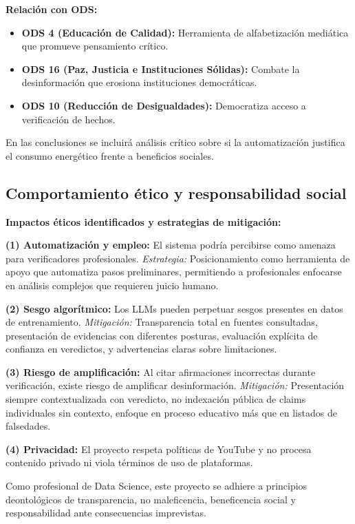 \documentclass[12pt,a4paper]{article}
\begin{document}
\textbf{Relación con ODS:}
\begin{itemize}
    \item \textbf{ODS 4 (Educación de Calidad):} Herramienta de alfabetización mediática que promueve pensamiento crítico.
    \item \textbf{ODS 16 (Paz, Justicia e Instituciones Sólidas):} Combate la desinformación que erosiona instituciones democráticas.
    \item \textbf{ODS 10 (Reducción de Desigualdades):} Democratiza acceso a verificación de hechos.
\end{itemize}

En las conclusiones se incluirá análisis crítico sobre si la automatización justifica el consumo energético frente a beneficios sociales.

\subsection{Comportamiento ético y responsabilidad social}

\textbf{Impactos éticos identificados y estrategias de mitigación:}

\textbf{(1) Automatización y empleo:} El sistema podría percibirse como amenaza para verificadores profesionales. \textit{Estrategia:} Posicionamiento como herramienta de apoyo que automatiza pasos preliminares, permitiendo a profesionales enfocarse en análisis complejos que requieren juicio humano.

\textbf{(2) Sesgo algorítmico:} Los LLMs pueden perpetuar sesgos presentes en datos de entrenamiento. \textit{Mitigación:} Transparencia total en fuentes consultadas, presentación de evidencias con diferentes posturas, evaluación explícita de confianza en veredictos, y advertencias claras sobre limitaciones.

\textbf{(3) Riesgo de amplificación:} Al citar afirmaciones incorrectas durante verificación, existe riesgo de amplificar desinformación. \textit{Mitigación:} Presentación siempre contextualizada con veredicto, no indexación pública de claims individuales sin contexto, enfoque en proceso educativo más que en listados de falsedades.

\textbf{(4) Privacidad:} El proyecto respeta políticas de YouTube y no procesa contenido privado ni viola términos de uso de plataformas.

Como profesional de Data Science, este proyecto se adhiere a principios deontológicos de transparencia, no maleficencia, beneficencia social y responsabilidad ante consecuencias imprevistas.
\end{document}
